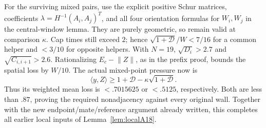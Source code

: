 \documentclass[11pt]{article}
\theoremstyle{definition}
\theoremstyle{remark}
\newcommand{\ip}[2]{\langle #1,#2\rangle}
\newcommand{\norm}[1]{\lVert #1\rVert}
\begin{document}
For the surviving mixed pairs, use the explicit
positive Schur matrices, coefficients
\(\lambda=H^{-1}(A_i,A_j)^T\), and all four
orientation formulas for \(W_i,\allowbreak W_j\) in the
central-window lemma. They are purely geometric,
so remain valid at comparison \(\kappa\).
Cap times still exceed \(2\); hence
\(\sqrt{1+\mathcal D}/W<7/16\) for a common
helper and \(<3/10\) for opposite helpers.
With \(N=19\), \(\sqrt{D_i}>2.7\) and
\(\sqrt{C_{i,i+1}}>2.6\).
Rationalizing \(E_c-\norm Z\), as in the
prefix proof, bounds the spatial loss by \(W/10\).
The actual mixed-point pressure now is
\[
 \ip{y}{Z}\geq
  1+\mathcal D-\kappa\sqrt{1+\mathcal D}.
\]
Thus its weighted mean loss is \(<.7015625\)
or \(<.5125\), respectively.
Both are less than \(.87\), proving the
required nonadjacency against every original wall.
Together with the new endpoint/mate/reference
argument already written, this completes all
earlier local inputs of Lemma~\ref{lem:localA18}.
\end{document}
